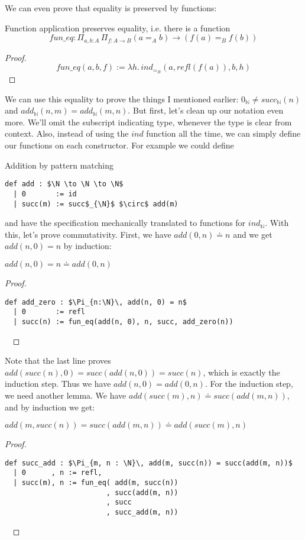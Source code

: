 \documentclass[a4paper, 12pt]{article}
\newcommand{\N}{\mathbb{N}}
\newcommand{\la}[1]{\lambda{#1}.\,}
\theoremstyle{changedot}
\theoremstyle{changedotbreak}
\theoremstyle{nonumberplain}
\newtheorem{proof}{Proof}
\begin{document}
We can even prove that equality is preserved by functions:
\begin{theorem}
  Function application preserves equality, i.e. there is a function
  \[\mathit{fun\_eq} : \Pi_{a, b: A}\, \Pi_{f : A \to B} (a =_{A} b) \to (f(a) =_{B} f(b))\]
\end{theorem}
\begin{proof}
  \[\mathit{fun\_eq}(a, b, f) := \la h ind_{=_{B}}(a, refl(f(a)), b, h)\]
\end{proof}

We can use this equality to prove the things I mentioned earlier: $0_{\N} \neq succ_{\N}(n)$ and $add_{\N}(n, m) = add_{\N}(m, n)$. But first, let's clean up our notation even more. We'll omit the subscript indicating type, whenever the type is clear from context. Also, instead of using the $ind$ function all the time, we can simply define our functions on each constructor. For example we could define
\begin{definition} Addition by pattern matching
\begin{lstlisting}[mathescape=true]
  def add : $\N \to \N \to \N$
  | 0       := id
  | succ(m) := succ$_{\N}$ $\circ$ add(m)
\end{lstlisting}
\end{definition}

and have the specification mechanically translated to functions for $ind_{\N}$. With this, let's prove commutativity. First, we have $add(0, n) \doteq n$ and we get $add(n, 0) = n$ by induction:

\begin{lemma}
  $add(n, 0) = n \doteq add(0, n)$
\end{lemma}
\begin{proof} ~
\begin{lstlisting}[mathescape=true]
  def add_zero : $\Pi_{n:\N}\, add(n, 0) = n$
  | 0       := refl
  | succ(n) := fun_eq(add(n, 0), n, succ, add_zero(n))
\end{lstlisting}~
\end{proof}

Note that the last line proves $add(succ(n), 0) = succ(add(n, 0)) = succ(n)$, which is exactly the induction step. Thus we have $add(n, 0) = add(0, n)$. For the induction step, we need another lemma. We have $add(succ(m), n) \doteq succ(add(m, n))$, and by induction we get:

\begin{lemma}
  $add(m, succ(n)) = succ(add(m, n)) \doteq add(succ(m), n)$
\end{lemma}
\begin{proof}~
\begin{lstlisting}[mathescape=true]
  def succ_add : $\Pi_{m, n : \N}\, add(m, succ(n)) = succ(add(m, n))$
  | 0      , n := refl,
  | succ(m), n := fun_eq( add(m, succ(n))
                        , succ(add(m, n))
                        , succ
                        , succ_add(m, n))
\end{lstlisting}~
\end{proof}
\end{document}
